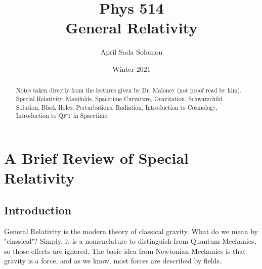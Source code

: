 \documentclass{article}
\title{Phys 514 \\
	\large General Relativity}
\author{April Sada Solomon}
\date{Winter 2021}
\begin{document}
	\clearpage
	\maketitle
	
	\vspace{2cm}
	
	\renewcommand{\abstractname}{Course Description}
	\begin{abstract}
		 Notes taken directly from the lectures given by Dr. Maloney (not proof read by him). Special Relativity, Manifolds, Spacetime Curvature, Gravitation, Schwarzchild Solution, Black Holes, Perturbations, Radiation, Introduction to Cosmology, Introduction to QFT in Spacetime. 
	\end{abstract}
	
	\newpage
	
	\tableofcontents
	
	\newpage
	
	\setcounter{page}{1}
	\cfoot{\thepage}
	
	\section{A Brief Review of Special Relativity}
	\subsection{Introduction}
 		General Relativity is the modern theory of classical gravity. What do we mean by "classical"? Simply, it is a nomenclature to distinguish from Quantum Mechanics, so those effects are ignored. The basic idea from Newtonian Mechanics is that gravity is a force, and as we know, most forces are described by fields.
 		
\end{document}
